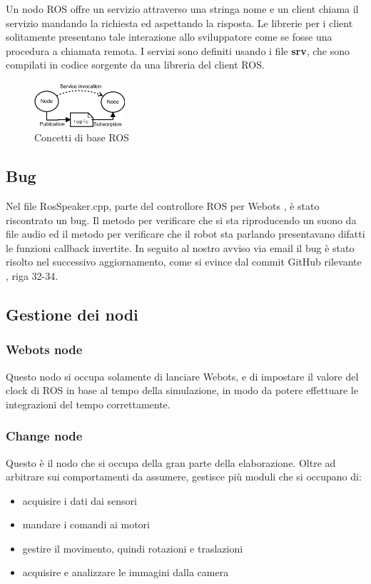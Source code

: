\documentclass[a4paper]{article}
\begin{document}
	Un nodo ROS offre un servizio attraverso una stringa nome e un
	client chiama il servizio mandando la richiesta ed aspettando la risposta.
	Le librerie per i client solitamente presentano tale interazione allo
	sviluppatore come se fosse una procedura a chiamata remota. I servizi sono
	definiti usando i file \textbf{srv}, che sono compilati in codice sorgente
	da una libreria del client ROS.
	
	\begin{figure}[H]
		\centering
		\includegraphics[width=0.3\textwidth]{./img/ROS_basic_concepts.pdf}
		\caption{Concetti di base ROS}
		\label{fig:ros_concepts}
	\end{figure}
	
	\subsection{Bug}\label{subsec:Bug}
	Nel file RosSpeaker.cpp, parte del controllore ROS per Webots
	\cite{cyberbotics}, è stato riscontrato un bug. Il metodo per verificare
	che si sta riproducendo un suono da file audio ed il metodo per verificare
	che il robot sta parlando presentavano difatti le funzioni callback
	invertite. In seguito al nostro avviso via email il bug è stato risolto nel
	successivo aggiornamento, come si evince dal commit GitHub rilevante
	\cite{rosbug}, riga 32-34.
	
	\subsection{Gestione dei nodi}\label{subsec:Gestione-dei-nodi}
	\subsubsection{Webots node}\label{subsubsec:Webots-node}
	Questo nodo si occupa solamente di lanciare Webots, e di impostare il
	valore del clock di ROS in base al tempo della simulazione, in modo da
	potere effettuare le integrazioni del tempo correttamente.
	\subsubsection{Change node}\label{subsubsec:Change-node}
	Questo è il nodo che si occupa della gran parte della elaborazione. Oltre
	ad arbitrare sui comportamenti da assumere, gestisce più moduli che si
	occupano di: 
	\begin{itemize}
		\item acquisire i dati dai sensori
		\item mandare i comandi ai motori
		\item gestire il movimento, quindi rotazioni e traslazioni
		\item acquisire e analizzare le immagini dalla camera
	\end{itemize}
\end{document}
